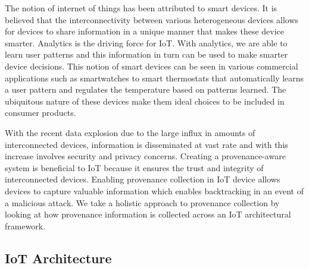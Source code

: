 The notion of internet of things has been attributed to smart devices. It is believed that the interconnectivity between various heterogeneous devices allows for devices to share information in a unique manner that makes these device smarter. Analytics is the driving force for IoT. With analytics, we are able to learn user patterns  and this information in turn can be used to make smarter device decisions. This notion of smart devices can be seen in various commercial applications such as smartwatches to smart thermostats that automatically learns a user pattern and regulates the temperature based on patterns learned. The ubiquitous nature of these devices make them ideal choices to be included in consumer products. 

\par With the recent data explosion due to the large influx in amounts of interconnected devices, information is disseminated at vast rate and with this increase involves security and privacy concerns. Creating a provenance-aware system is beneficial to IoT because it ensures the trust and  integrity of interconnected devices. Enabling provenance collection in IoT device allows devices to capture valuable information which enables backtracking in an event of a malicious attack. We take a holistic approach to provenance collection by looking at how provenance information is collected across an IoT architectural framework.

 
  \subsection{IoT Architecture}

